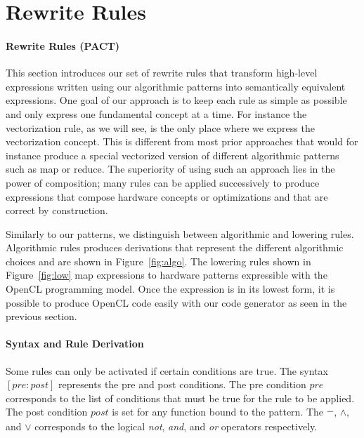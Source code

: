 \section{Rewrite Rules}
\label{section:rules}

\paragraph{Rewrite Rules (PACT)}

This section introduces our set of rewrite rules that transform high-level expressions written using our algorithmic patterns into semantically equivalent expressions.
One goal of our approach is to keep each rule as simple as possible and only express one fundamental concept at a time.
For instance the vectorization rule, as we will see, is the only place where we express the vectorization concept.
This is different from most prior approaches that would for instance produce a special vectorized version of different algorithmic patterns such as map or reduce.
The superiority of using such an approach lies in the power of composition;
many rules can be applied successively to produce expressions that compose hardware concepts or optimizations and that are correct by construction.

Similarly to our patterns, we distinguish between algorithmic and lowering rules.
Algorithmic rules produces derivations that represent the different algorithmic choices and are shown in Figure~\ref{fig:algo}.
The lowering rules shown in Figure~\ref{fig:low} map expressions to hardware patterns expressible with the OpenCL programming model.
Once the expression is in its lowest form, it is possible to produce OpenCL code easily with our code generator as seen in the previous section.


\paragraph{Syntax and Rule Derivation}
Some rules can only be activated if certain conditions are true.
The syntax $[pre:post]$ represents the pre and post conditions.
The pre condition $pre$ corresponds to the list of conditions that must be true for the rule to be applied.
The post condition $post$ is set for any function bound to the pattern.
The $\overline{\rule[-.3\baselineskip]{0pt}{1.5ex}\hspace{1.5ex}}$, $\wedge$, and $\vee$ corresponds to the logical \emph{not}, \emph{and}, and \emph{or} operators respectively.

